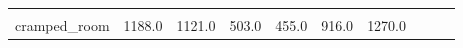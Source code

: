 \begin{table}[t]
\begin{center}
\begin{tabular}{llllllllll}
           
           

        
           &
           
           
           

        
           &
           
           
           

        
           &
           
           
           

        
           &
           
           
           

        
           &
           
           
           

        
           &
           
           
           

        
           &
           
           
           

         \\

        cramped_room
        
           &
           
           1188.0
           

        
           &
           
           1121.0
           

        
           &
           
           503.0
           

        
           &
           
           455.0
           

        
           &
           
           916.0
           

        
           &
           
           1270.0
           

        
           &
           

\end{tabular}
\end{center}
\end{table}
